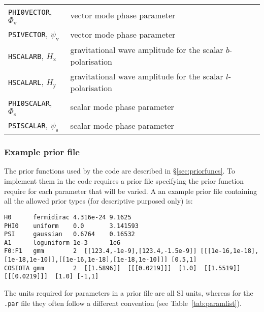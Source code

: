 \begin{longtable}{p{}|p{}}
{\tt PHI0VECTOR}, $\Phi_{\text{v}}$ & vector mode phase parameter \\
{\tt PSIVECTOR}, $\psi_{\text{v}}$ & vector mode phase parameter \\
{\tt HSCALARB}, $H_{\text{x}}$ &  gravitational wave amplitude for the scalar $b$-polarisation \\
{\tt HSCALARL}, $H_{\text{y}}$ &  gravitational wave amplitude for the scalar $l$-polarisation \\
{\tt PHI0SCALAR}, $\Phi_{\text{s}}$ & scalar mode phase parameter \\
{\tt PSISCALAR}, $\psi_{\text{s}}$ & scalar mode phase parameter \\
\hline
\hline
\end{longtable}


\subsubsection{Example prior file}\label{sec:priorfile}

The prior functions used by the code are described in \S\ref{sec:priorfuncs}. To implement them in the code requires a prior
file specifying the prior function require for each parameter that will be varied. A an example prior file containing all the
allowed prior types (for descriptive purposed only) is:
\begin{lstlisting}[frame=single]
H0      fermidirac 4.316e-24 9.1625
PHI0    uniform    0.0       3.141593
PSI     gaussian   0.6764    0.16532
A1      loguniform 1e-3      1e6
F0:F1   gmm        2  [[123.4,-1e-9],[123.4,-1.5e-9]] [[[1e-16,1e-18],[1e-18,1e-10]],[[1e-16,1e-18],[1e-18,1e-10]]] [0.5,1]
COSIOTA gmm        2  [[1.5896]]  [[[0.0219]]]  [1.0]  [[1.5519]]  [[[0.0219]]]  [1.0] [-1,1]
\end{lstlisting}
The units required for parameters in a prior file are all SI units, whereas for the {\tt .par} file they often follow a different
convention (see Table~\ref{tab:paramlist}).

